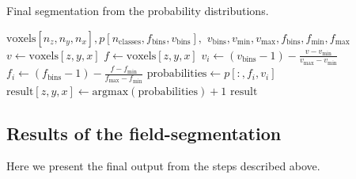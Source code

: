 \documentclass[pdflatex,sn-mathphys]{sn-jnl}%
\theoremstyle{thmstyleone}%
\theoremstyle{thmstyletwo}%
\theoremstyle{thmstylethree}%
\begin{document}
\begin{algorithm}
    \caption{Final segmentation from the probability distributions.}
    \label{alg:segment}
    \begin{algorithmic}
         {$\text{voxels}[n_z,n_y,n_x], p[n_\text{classes},f_\text{bins},v_\text{bins}],$ \newline \indent \indent $v_\text{bins}, v_\text{min}, v_\text{max}, f_\text{bins}, f_\text{min}, f_\text{max}$}
                \State $v \gets \text{voxels}[z,y,x]$
                    \State $f \gets \text{voxels}[z,y,x]$
                        \State $v_i \gets (v_\text{bins} - 1) - \frac{v - v_\text{min}}{v_\text{max} - v_\text{min}}$
                        \State $f_i \gets (f_\text{bins} - 1) - \frac{f - f_\text{min}}{f_\text{max} - f_\text{min}}$
                        \State $\text{probabilities} \gets p[:,f_i,v_i]$
                        \State $\text{result}[z,y,x] \gets \text{argmax}(\text{probabilities}) + 1$
                    \EndIf
                \EndIf
            \EndFor
            \State \Return $\text{result}$
        \EndFunction
    \end{algorithmic}
\end{algorithm}

\subsection{Results of the field-segmentation}

Here we present the final output from the steps described above.
\end{document}
